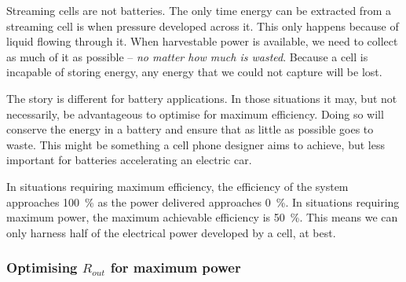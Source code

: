     Streaming cells are not batteries.
    The only time energy can be extracted from a streaming cell is when pressure developed across it.
    This only happens because of liquid flowing through it.
    When harvestable power is available, we need to collect as much of it as possible -- \emph{no matter how much is wasted}.
    Because a cell is incapable of storing energy, any energy that we could not capture will be lost.

    The story is different for battery applications.
    In those situations it may, but not necessarily, be advantageous to optimise for maximum efficiency.
    Doing so will conserve the energy in a battery and ensure that as little as possible goes to waste.
    This might be something a cell phone designer aims to achieve, but less important for batteries accelerating an electric car.

    In situations requiring maximum efficiency, the efficiency of the system approaches \SI{100}{\percent} as the power delivered approaches \SI{0}{\percent}.
    In situations requiring maximum power, the maximum achievable efficiency is \SI{50}{\percent}.
    This means we can only harness half of the electrical power developed by a cell, at best.


    \subsubsection*{Optimising $R_{out}$ for maximum power}


